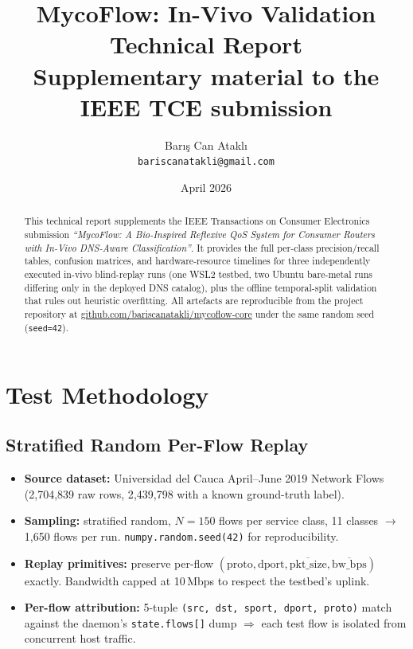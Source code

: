 \documentclass[11pt,a4paper]{article}
\title{\textbf{MycoFlow: In-Vivo Validation Technical Report}\\
       \large Supplementary material to the IEEE TCE submission}
\author{Bar\i{}\c{s} Can Atakl\i{}\\\small\texttt{bariscanatakli@gmail.com}}
\date{April 2026}
\begin{document}
\maketitle

\begin{abstract}
\noindent
This technical report supplements the IEEE Transactions on Consumer
Electronics submission \emph{``MycoFlow: A Bio-Inspired Reflexive QoS
System for Consumer Routers with In-Vivo DNS-Aware Classification''}.
It provides the full per-class precision/recall tables, confusion
matrices, and hardware-resource timelines for three independently
executed in-vivo blind-replay runs (one WSL2 testbed, two Ubuntu
bare-metal runs differing only in the deployed DNS catalog), plus the
offline temporal-split validation that rules out heuristic overfitting.
All artefacts are reproducible from the project repository at
\href{https://github.com/bariscanatakli/mycoflow-core}{github.com/bariscanatakli/mycoflow-core}
under the same random seed (\texttt{seed=42}).
\end{abstract}

\section{Test Methodology}

\subsection{Stratified Random Per-Flow Replay}

\begin{itemize}
\item \textbf{Source dataset:} Universidad del Cauca April--June 2019
Network Flows (2{,}704{,}839 raw rows, 2{,}439{,}798 with a known
ground-truth label).
\item \textbf{Sampling:} stratified random, $N=150$ flows per service
class, 11 classes $\rightarrow$ 1{,}650 flows per run.
\texttt{numpy.random.seed(42)} for reproducibility.
\item \textbf{Replay primitives:} preserve per-flow $(\text{proto},
\text{dport}, \overline{\text{pkt\_size}}, \overline{\text{bw\_bps}})$
exactly. Bandwidth capped at 10\,Mbps to respect the testbed's uplink.
\item \textbf{Per-flow attribution:} 5-tuple \texttt{(src, dst, sport,
dport, proto)} match against the daemon's \texttt{state.flows[]} dump
$\Rightarrow$ each test flow is isolated from concurrent host traffic.
\end{itemize}
\end{document}
